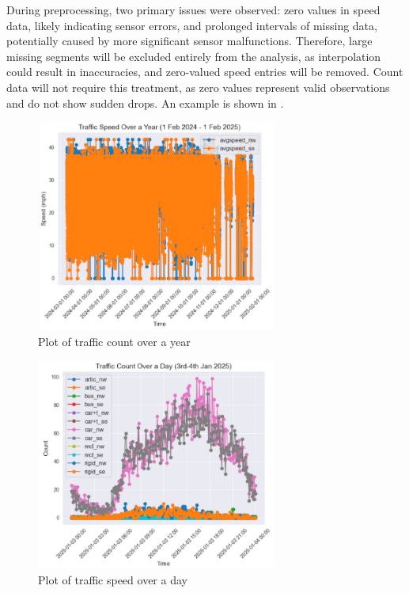 During preprocessing, two primary issues were observed: zero values in speed data, likely indicating sensor errors, and prolonged intervals of missing data, potentially caused by more significant sensor malfunctions. Therefore, large missing segments will be excluded entirely from the analysis, as interpolation could result in inaccuracies, and zero-valued speed entries will be removed. Count data will not require this treatment, as zero values represent valid observations and do not show sudden drops. An example is shown in .

\begin{figure}[!ht]
  \centering
  \includegraphics[width=0.7\textwidth]{images/design-implementation/traffic-speed-year.pdf}
  \caption{Plot of traffic count over a year}
  \label{fig:traffic-speed-year}
\end{figure}

\begin{figure}[!ht]
  \centering
  \includegraphics[width=0.7\textwidth]{images/design-implementation/traffic-count-day.pdf}
  \caption{Plot of traffic speed over a day}
  \label{fig:traffic-count-day}
\end{figure}

